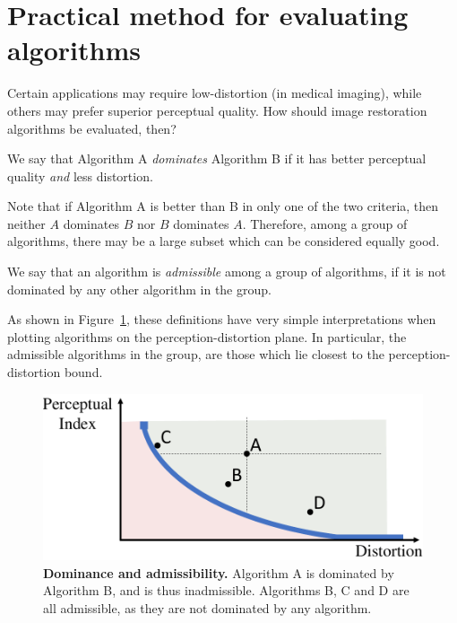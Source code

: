 \section{Practical method for evaluating algorithms}\label{sec:practicalMethod}

Certain applications may require low-distortion (\eg in medical imaging), while others may prefer superior perceptual quality. How should image restoration algorithms be evaluated, then?
\begin{definition}
We say that Algorithm A \emph{dominates} Algorithm B if it has better perceptual quality \emph{and} less distortion.
\end{definition}
Note that if Algorithm A is better than B in only one of the two criteria, then neither $A$ dominates $B$ nor $B$ dominates $A$. Therefore, among a group of algorithms, there may be a large subset which can be considered equally good.
\begin{definition}
We say that an algorithm is \emph{admissible} among a group of algorithms, if it is not dominated by any other algorithm in the group.
\end{definition}
As shown in Figure~\ref{fig:dominantAdmissable}, these definitions have very simple interpretations when plotting algorithms on the perception-distortion plane. In particular, the admissible algorithms in the group, are those which lie closest to the perception-distortion bound.

\begin{figure}
	\begin{center}
		\includegraphics[width=0.85\linewidth]{figures/dominantAdmissable.pdf}
	\end{center}
	\caption{\textbf{Dominance and admissibility.} Algorithm A is dominated by Algorithm B, and is thus inadmissible. Algorithms B, C and D are all admissible, as they are not dominated by any algorithm.}
	\label{fig:dominantAdmissable}
\end{figure}


